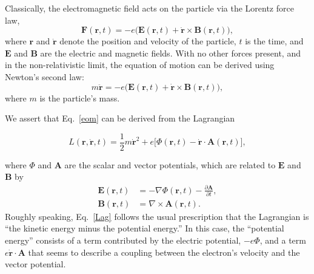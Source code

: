 \documentclass[prx,12pt]{revtex4-2}
\begin{document}
Classically, the electromagnetic field acts on the particle via the
Lorentz force law,
\begin{equation}
  \mathbf{F}(\mathbf{r},t) = -e\Big(\mathbf{E}(\mathbf{r},t)
  + \dot{\mathbf{r}}\times \mathbf{B}(\mathbf{r},t)\Big),
\end{equation}
where $\mathbf{r}$ and $\dot{\mathbf{r}}$ denote the position and
velocity of the particle, $t$ is the time, and $\mathbf{E}$ and
$\mathbf{B}$ are the electric and magnetic fields.  With no other
forces present, and in the non-relativistic limit, the equation of
motion can be derived using Newton's second law:
\begin{equation}
  m\ddot{\mathbf{r}} = -e\Big(\mathbf{E}(\mathbf{r},t)
  + \dot{\mathbf{r}} \times \mathbf{B}(\mathbf{r},t)\Big),
  \label{eom}
\end{equation}
where $m$ is the particle's mass.

We assert that Eq.~\eqref{eom} can be derived from the Lagrangian
\begin{framed}
\begin{equation}
  L(\mathbf{r},\dot{\mathbf{r}},t) = \frac{1}{2}m\dot{\mathbf{r}}^2
  + e \Big[\Phi(\mathbf{r},t) - \dot{\mathbf{r}} \cdot \mathbf{A}(\mathbf{r},t)
    \Big],
  \label{Lag}
\end{equation}
\end{framed}
\noindent
where $\Phi$ and $\mathbf{A}$ are the scalar and vector potentials,
which are related to $\mathbf{E}$ and $\mathbf{B}$ by
\begin{align}
  \mathbf{E}(\mathbf{r},t) &= - \nabla \Phi(\mathbf{r},t) - \frac{\partial\mathbf{A}}{\partial t}, \label{Efield0} \\
  \mathbf{B}(\mathbf{r},t) &= \nabla \times \mathbf{A}(\mathbf{r},t).
  \label{Bfield0}
\end{align}
Roughly speaking, Eq.~\eqref{Lag} follows the usual prescription that
the Lagrangian is ``the kinetic energy minus the potential energy.''
In this case, the ``potential energy'' consists of a term contributed
by the electric potential, $-e\Phi$, and a term $e\dot{\mathbf{r}}
\cdot \mathbf{A}$ that seems to describe a coupling between the
electron's velocity and the vector potential.
\end{document}
